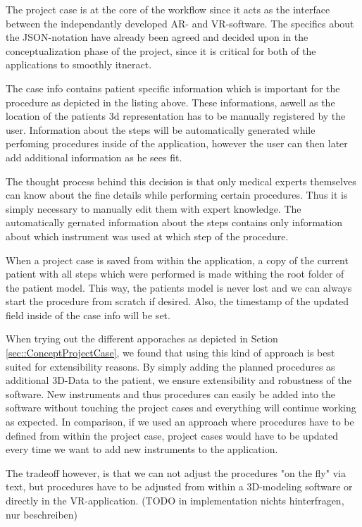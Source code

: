 The project case is at the core of the workflow since it acts as the interface between the independantly developed AR- and VR-software.
The specifics about the JSON-notation have already been agreed and decided upon in the conceptualization phase of the project, since it is critical for both of the applications to smoothly itneract. 

The case info contains patient specific information which is important for the procedure as depicted in the listing above.
These informations, aswell as the location of the patients 3d representation has to be manually registered by the user.
Information about the steps will be automatically generated while perfoming procedures inside of the application, however the user can then later add additional information as he sees fit.

The thought process behind this decision is that only medical experts themselves can know about the fine details while performing certain procedures.
Thus it is simply necessary to manually edit them with expert knowledge.
The automatically gernated information about the steps contains only information about which instrument was used at which step of the procedure.

When a project case is saved from within the application, a copy of the current patient with all steps which were performed is made withing the root folder of the patient model.
This way, the patients model is never lost and we can always start the procedure from scratch if desired.
Also, the timestamp of the updated field inside of the case info will be set.

When trying out the different apporaches as depicted in Setion \ref{sec::ConceptProjectCase}, we found that using this kind of approach is best suited for extensibility reasons.
By simply adding the planned procedures as additional 3D-Data to the patient, we ensure extensibility and robustness of the software.
New instruments and thus procedures can easily be added into the software without touching the project cases and everything will continue working as expected.
In comparison, if we used an approach where procedures have to be defined from within the project case, project cases would have to be updated every time we want to add new instruments to the application.

The tradeoff however, is that we can not adjust the procedures "on the fly" via text, but procedures have to be adjusted from within a 3D-modeling software or directly in the VR-application.
(TODO in implementation nichts hinterfragen, nur beschreiben)